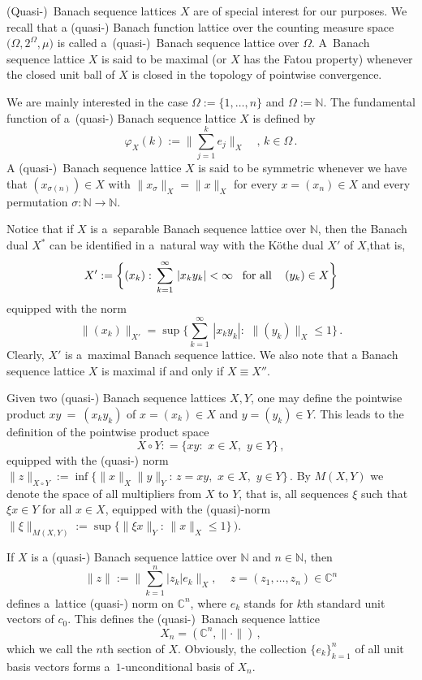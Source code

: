 \documentclass[12pt]{amsart}
\numberwithin{subsection}{section}
\theoremstyle{definition}
\theoremstyle{remark}
\begin{document}
(Quasi-)~Banach sequence lattices $X$ are of special interest for our purposes. We recall that a (quasi-) Banach function lattice
over the counting measure space $\big(\Omega, 2^{\Omega}, \mu\big)$ is called a~(quasi-)~Banach sequence lattice over $\Omega$.  A~Banach
sequence lattice $X$ is said to be maximal (or $X$ has the Fatou property) whenever the closed unit ball of $X$ is closed in the
topology of pointwise convergence.

We are mainly interested in the case $\Omega:=\{1, \ldots, n\}$ and $\Omega:=\mathbb{N}$. The fundamental function of a~(quasi-) Banach
sequence lattice $X$ is defined by
\[
\varphi_X(k):= \Big\|\sum_{j=1}^k e_j\Big\|_X \quad , \, k\in \mathbb{\Omega}\,.
\]
A (quasi-)~Banach sequence lattice $X$ is said to be symmetric whenever we have that $(x_{\sigma(n)}) \in X$ with $\|x_\sigma\|_X =\|x\|_X$
for every $x = (x_n)\in X$ and every permutation $\sigma: \mathbb{N} \to \mathbb{N}$.

Notice that if $X$ is a~separable Banach sequence lattice over $\mathbb{N}$, then the Banach dual $X^{*}$ can be identified in
a~natural way with the K\"othe dual $X'$ of $X$,that is,
\begin{align*}
X' := \bigg\{(x_k): \, \sum_{k=1}^{\infty}\, |x_k y_k| < \infty \, \, \, \, \,\mbox{for all \,\,\, $(y_k) \in X$} \bigg\}
\end{align*}
equipped with the norm
\[
\|(x_k)\|_{X'} = \sup\bigg\{\sum_{k=1}^{\infty}\,|x_k y_k|: \, \, \|(y_k)\|_X \leq 1 \bigg\}\,.
\]
Clearly, $X'$ is a~maximal Banach sequence lattice. We also note that  a Banach sequence lattice $X$
is  maximal if and only if  $X \equiv X''$.


Given two (quasi-) Banach sequence lattices $X,Y$, one may define  the pointwise product $x y~=~(x_k y_k)$ of $x = (x_k) \in X $  and
$y  = (y_k) \in Y$. This leads to the definition of the pointwise product space
$$X \circ Y : =\big\{ x y : \,\, x \in X, \,\, y \in  Y \big\}\,,$$
equipped with the (quasi-) norm $\|z\|_{X \circ Y}:= \inf \big\{\|x\|_{X} \|y\|_{Y}: \, z = x y,\,\, x\in X,\,\, y \in Y \big\}\,$.
By $M(X, Y)$ we denote the space of all multipliers from $X$ to $Y$, that is, all sequences $ \xi$ such that $ \xi x \in Y$
for all $x \in X$, equipped with the (quasi)-norm $\| \xi \|_{M(X, Y)} := \sup \big\{\| \xi x\|_{Y}:\, \|x\|_{X} \leq 1\big\}\,)$.


If $X$ is a (quasi-) Banach sequence lattice over $\mathbb{N}$ and $n \in \mathbb{N}$, then
\[
\|z\|:= \Big\|\sum_{k=1}^n |z_k| e_k\Big\|_{X}, \quad\, z=(z_1,\ldots, z_n)\in \mathbb{C}^n
\]
defines  a~lattice (quasi-) norm on $\mathbb{C}^n$, where $e_k$ stands for $k$th standard unit vectors of $c_0$. This defines the
(quasi-)~Banach sequence lattice
\[
X_n = (\mathbb{C}^n, \|\cdot\|)\,,
\]
which we call the $n$th section of $X$. Obviously, the collection $\{e_k\}_{k=1}^n$ of all unit basis vectors forms
a~$1$-unconditional basis of $X_n$.
\end{document}
